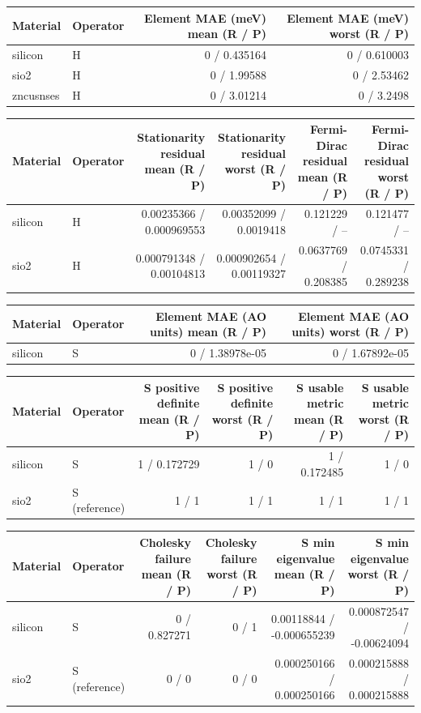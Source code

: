 \begin{tabular}{llrr}
\toprule
Material & Operator & Element MAE (meV) mean (R / P) & Element MAE (meV) worst (R / P) \\
\midrule
silicon & H & 0 / 0.435164 & 0 / 0.610003 \\
sio2 & H & 0 / 1.99588 & 0 / 2.53462 \\
zncusnses & H & 0 / 3.01214 & 0 / 3.2498 \\
\bottomrule
\end{tabular}
\begin{tabular}{llrrrr}
\toprule
Material & Operator & Stationarity residual mean (R / P) & Stationarity residual worst (R / P) & Fermi-Dirac residual mean (R / P) & Fermi-Dirac residual worst (R / P) \\
\midrule
silicon & H & 0.00235366 / 0.000969553 & 0.00352099 / 0.0019418 & 0.121229 / -- & 0.121477 / -- \\
sio2 & H & 0.000791348 / 0.00104813 & 0.000902654 / 0.00119327 & 0.0637769 / 0.208385 & 0.0745331 / 0.289238 \\
\bottomrule
\end{tabular}
\begin{tabular}{llrr}
\toprule
Material & Operator & Element MAE (AO units) mean (R / P) & Element MAE (AO units) worst (R / P) \\
\midrule
silicon & S & 0 / 1.38978e-05 & 0 / 1.67892e-05 \\
\bottomrule
\end{tabular}
\begin{tabular}{llrrrr}
\toprule
Material & Operator & S positive definite mean (R / P) & S positive definite worst (R / P) & S usable metric mean (R / P) & S usable metric worst (R / P) \\
\midrule
silicon & S & 1 / 0.172729 & 1 / 0 & 1 / 0.172485 & 1 / 0 \\
sio2 & S (reference) & 1 / 1 & 1 / 1 & 1 / 1 & 1 / 1 \\
\bottomrule
\end{tabular}
\begin{tabular}{llrrrr}
\toprule
Material & Operator & Cholesky failure mean (R / P) & Cholesky failure worst (R / P) & S min eigenvalue mean (R / P) & S min eigenvalue worst (R / P) \\
\midrule
silicon & S & 0 / 0.827271 & 0 / 1 & 0.00118844 / -0.000655239 & 0.000872547 / -0.00624094 \\
sio2 & S (reference) & 0 / 0 & 0 / 0 & 0.000250166 / 0.000250166 & 0.000215888 / 0.000215888 \\
\bottomrule
\end{tabular}
